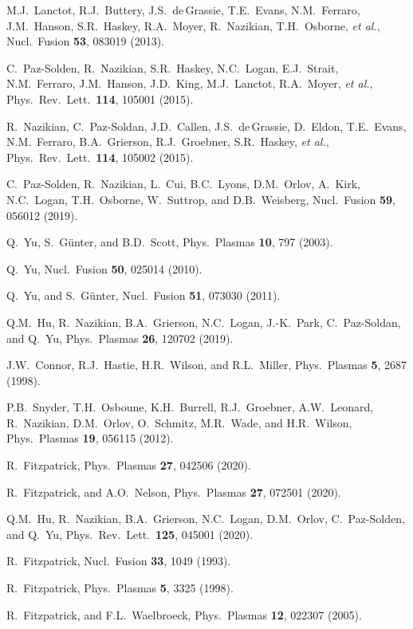 \documentclass[12pt,prb,aps]{revtex4-1}
\begin{document}
\begin{thebibliography}{99}
 M.J.~Lanctot, R.J.~Buttery, J.S.~de\,Grassie, T.E.~Evans, N.M.~Ferraro, J.M.~Hanson, S.R.~Haskey,  R.A.~Moyer, R.~Nazikian, T.H.~Osborne, {\em et al.}, 
Nucl.\ Fusion {\bf 53}, 083019 (2013). 

 C.~Paz-Solden, R.~Nazikian, S.R.~Haskey, N.C.~Logan, E.J.~Strait, N.M.~Ferraro, J.M.~Hanson, J.D.~King, M.J.~Lanctot, R.A.~Moyer, {\it et al.}, 
Phys.\ Rev.\ Lett.\ {\bf 114}, 105001 (2015).

 R.~Nazikian, C.~Paz-Soldan, J.D.~Callen,  J.S.~de\,Grassie, D.~Eldon, T.E.~Evans, N.M.~Ferraro,  B.A.~Grierson, R.J.~Groebner, S.R.~Haskey, {\em et al.}, 
Phys.\ Rev.\ Lett.\ {\bf 114}, 105002 (2015).

 C.~Paz-Solden, R.~Nazikian, L.~Cui, B.C.~Lyons,  D.M.~Orlov, A.~Kirk, N.C.~Logan, T.H.~Osborne, W.~Suttrop, and D.B.~Weisberg, 
Nucl.\ Fusion {\bf 59}, 056012 (2019). 

 Q.~Yu, S.~G\"{u}nter,  and B.D.~Scott, Phys.\ Plasmas {\bf 10}, 797 (2003).

 Q.~Yu, Nucl.\ Fusion {\bf 50}, 025014 (2010).

 Q.~Yu, and S.~G\"unter,  Nucl.\ Fusion {\bf 51},  073030 (2011).

 Q.M.~Hu,  R.~Nazikian,  B.A.~Grierson,  N.C.~Logan,  J.-K.~Park,  C.~Paz-Soldan, and Q.~Yu,  Phys.\ Plasmas {\bf 26}, 120702 (2019).
 
 J.W.~Connor,  R.J.~Hastie, H.R.~Wilson, and R.L.~Miller, Phys.\ Plasmas  {\bf 5}, 2687 (1998).

  P.B.~Snyder, T.H.~Osboune, K.H.~Burrell, R.J.~Groebner, A.W.~Leonard, R.~Nazikian, D.M.~Orlov, O.~Schmitz, M.R.~Wade, and H.R.~Wilson, 
 Phys.\ Plasmas {\bf 19}, 056115 (2012).

 R.~Fitzpatrick, Phys.\ Plasmas {\bf 27}, 042506 (2020).

 R.~Fitzpatrick, and A.O.~Nelson, Phys.\ Plasmas {\bf 27}, 072501 (2020).

 Q.M.~Hu, R.~Nazikian, B.A.~Grierson, N.C.~Logan, D.M.~Orlov, C.~Paz-Solden, and Q.~Yu, 
Phys.\ Rev.\ Lett.\ {\bf 125}, 045001 (2020).

 R.~Fitzpatrick, Nucl.\ Fusion {\bf 33}, 1049 (1993).

 R.~Fitzpatrick, Phys.\ Plasmas {\bf 5}, 3325 (1998).

 R.~Fitzpatrick, and F.L.~Waelbroeck, Phys.\ Plasmas {\bf 12}, 022307 (2005).


\end{thebibliography}
\end{document}
